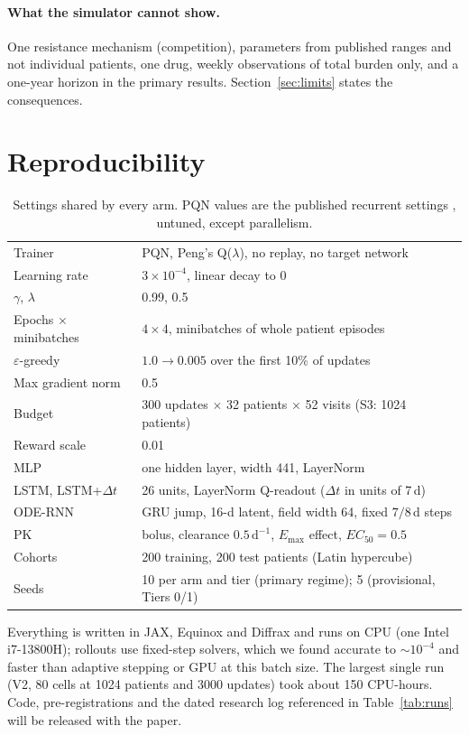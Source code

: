 \documentclass[10pt]{article}
\renewcommand{\cite}{\citep}
\begin{document}
\paragraph{What the simulator cannot show.} One resistance mechanism
(competition), parameters from published ranges and not individual patients,
one drug, weekly observations of total burden only, and a one-year horizon in
the primary results. Section~\ref{sec:limits} states the consequences.

\section{Reproducibility}\label{sec:repro}
\begin{table}[h]
\centering\footnotesize
\caption{Settings shared by every arm. PQN values are the published recurrent
settings \cite{gallici2024}, untuned, except parallelism.}
\label{tab:hparams}
\begin{tabular}{@{}ll@{}}
\toprule
Trainer & PQN, Peng's Q($\lambda$), no replay, no target network \\
Learning rate & $3\times10^{-4}$, linear decay to 0 \\
$\gamma$, $\lambda$ & 0.99, 0.5 \\
Epochs $\times$ minibatches & $4\times4$, minibatches of whole patient episodes \\
$\varepsilon$-greedy & $1.0\to0.005$ over the first 10\% of updates \\
Max gradient norm & 0.5 \\
Budget & 300 updates $\times$ 32 patients $\times$ 52 visits (S3: 1024 patients) \\
Reward scale & 0.01 \\
\midrule
MLP & one hidden layer, width 441, LayerNorm \\
LSTM, LSTM+$\Delta t$ & 26 units, LayerNorm Q-readout ($\Delta t$ in units of 7\,d) \\
ODE-RNN & GRU jump, 16-d latent, field width 64, fixed $7/8$\,d steps \\
\midrule
PK & bolus, clearance $0.5\,\mathrm{d}^{-1}$, $E_{\max}$ effect, $EC_{50}=0.5$ \\
Cohorts & 200 training, 200 test patients (Latin hypercube) \\
Seeds & 10 per arm and tier (primary regime); 5 (provisional, Tiers 0/1) \\
\bottomrule
\end{tabular}
\end{table}
Everything is written in JAX, Equinox and Diffrax and runs on CPU (one Intel
i7-13800H); rollouts use fixed-step solvers, which we found accurate to
${\sim}10^{-4}$ and faster than adaptive stepping or GPU at this batch size.
The largest single run (V2, 80 cells at 1024 patients and 3000 updates) took
about 150 CPU-hours. Code, pre-registrations and the dated research log
referenced in Table~\ref{tab:runs} will be released with the paper.
\end{document}
